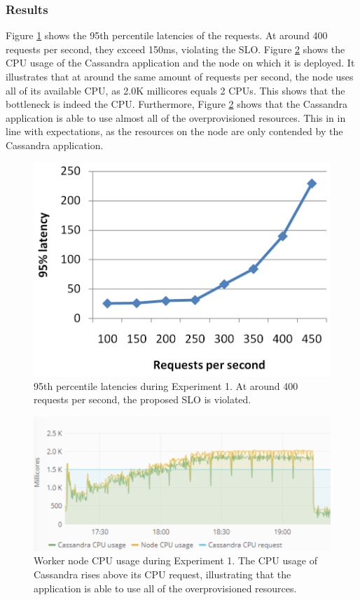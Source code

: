 \subsubsection{Results}
Figure \ref{fig:lat-cas-li} shows the 95th percentile latencies of the requests. At around 400 requests per second, they exceed 150ms, violating the SLO. Figure \ref{fig:cpu-cas-li} shows the CPU usage of the Cassandra application and the node on which it is deployed. It illustrates that at around the same amount of requests per second, the node uses all of its available CPU, as 2.0K millicores equals 2 CPUs. This shows that the bottleneck is indeed the CPU. Furthermore, Figure \ref{fig:cpu-cas-li} shows that the Cassandra application is able to use almost all of the overprovisioned resources. This in in line with expectations, as the resources on the node are only contended by the Cassandra application.

\begin{figure}
\centering
\includegraphics[width=0.55\columnwidth]{Images/Experiments/CPU/Latencies/cas-li.PNG}
\caption{95th percentile latencies during Experiment 1. At around 400 requests per second, the proposed SLO is violated.}
\label{fig:lat-cas-li} 
\end{figure}

\begin{figure}
\centering
\includegraphics[width=0.80\columnwidth]{Images/Experiments/CPU/Grafana/cpu-cas-li.PNG}
\caption{Worker node CPU usage during Experiment 1. The CPU usage of Cassandra rises above its CPU request, illustrating that the application is able to use all of the overprovisioned resources.}
\label{fig:cpu-cas-li} 
\end{figure}

